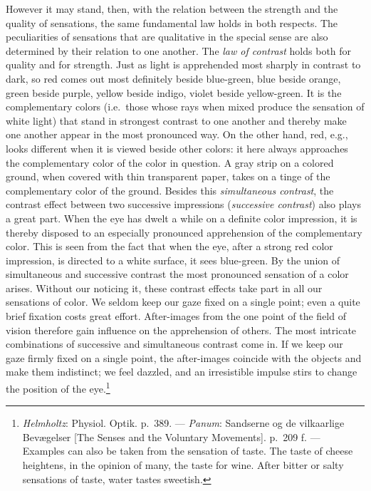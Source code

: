 \documentclass[12pt,a4paper]{book}
\newcommand{\opage}[1]{\marginnote{\footnotesize\textit{[#1]}}}
\begin{document}
However it may stand, then, with the relation between the strength and
the quality of sensations, the same fundamental law holds in both
respects. The peculiarities of sensations that are qualitative in the
special sense are also determined by their relation to one another. The
\emph{law of contrast} holds both for quality and for strength. Just as
light is apprehended most sharply in contrast to dark, so red comes out
most definitely beside blue-green, blue beside orange, green beside
purple, yellow beside indigo, violet beside yellow-green. It is the
complementary colors (i.e.\ those whose rays when mixed produce the
sensation of white light) that stand in strongest contrast to one
another and thereby make one another appear in the most pronounced way.
On the other hand, red, e.g., looks different when it is viewed beside
other colors: it here always approaches the complementary color of the
color in question. A gray strip on a colored ground, when covered with
thin transparent paper, takes on a tinge of the complementary color of
the ground. Besides this \emph{simultaneous contrast}, the contrast
effect between two successive impressions (\emph{successive contrast})
also plays a great part. When the eye has dwelt a while on a definite
color impression, it is thereby disposed to an especially pronounced
apprehension of the complementary color. This is seen from the fact that
when the eye, after a strong red color impression, is directed to a
white surface, it sees blue-green. By the union of simultaneous and
successive contrast the most pronounced sensation of a color arises.
Without our noticing it, these contrast effects take part in all our
sensations of color. We seldom keep our gaze fixed on a single point;
even a quite brief fixation costs great effort. After-images from the
one point of the field of vision therefore gain influence on the
apprehension of others. The most intricate combinations of successive
and simultaneous contrast come in. If we keep our gaze firmly fixed on a
single point, the after-images coincide with the objects and make
\opage{139}them indistinct; we feel dazzled, and an irresistible impulse
stirs to change the position of the
eye.\footnote{\emph{Helmholtz}: Physiol. Optik. p.~389. ---
\emph{Panum}: Sandserne og de vilkaarlige Bevægelser [The Senses and the
Voluntary Movements]. p.~209 f. --- Examples can also be taken from the
sensation of taste. The taste of cheese heightens, in the opinion of
many, the taste for wine. After bitter or salty sensations of taste,
water tastes sweetish.}
\end{document}
